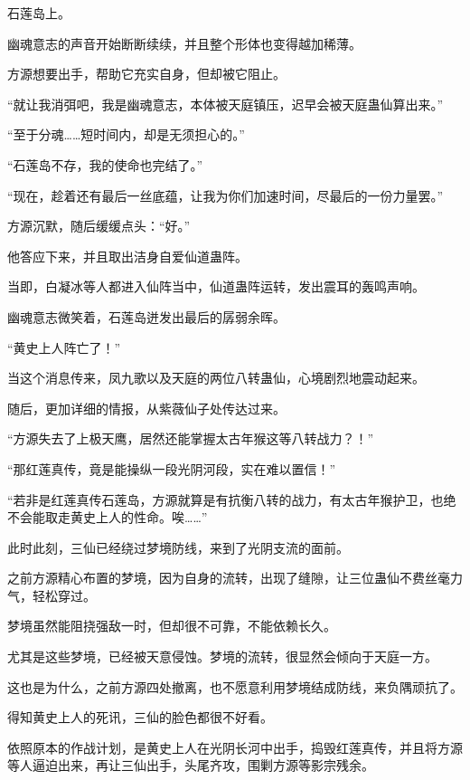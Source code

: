 
\begin{this_body}

石莲岛上。

幽魂意志的声音开始断断续续，并且整个形体也变得越加稀薄。

方源想要出手，帮助它充实自身，但却被它阻止。

“就让我消弭吧，我是幽魂意志，本体被天庭镇压，迟早会被天庭蛊仙算出来。”

“至于分魂……短时间内，却是无须担心的。”

“石莲岛不存，我的使命也完结了。”

“现在，趁着还有最后一丝底蕴，让我为你们加速时间，尽最后的一份力量罢。”

方源沉默，随后缓缓点头：“好。”

他答应下来，并且取出洁身自爱仙道蛊阵。

当即，白凝冰等人都进入仙阵当中，仙道蛊阵运转，发出震耳的轰鸣声响。

幽魂意志微笑着，石莲岛迸发出最后的孱弱余晖。

“黄史上人阵亡了！”

当这个消息传来，凤九歌以及天庭的两位八转蛊仙，心境剧烈地震动起来。

随后，更加详细的情报，从紫薇仙子处传达过来。

“方源失去了上极天鹰，居然还能掌握太古年猴这等八转战力？！”

“那红莲真传，竟是能操纵一段光阴河段，实在难以置信！”

“若非是红莲真传石莲岛，方源就算是有抗衡八转的战力，有太古年猴护卫，也绝不会能取走黄史上人的性命。唉……”

此时此刻，三仙已经绕过梦境防线，来到了光阴支流的面前。

之前方源精心布置的梦境，因为自身的流转，出现了缝隙，让三位蛊仙不费丝毫力气，轻松穿过。

梦境虽然能阻挠强敌一时，但却很不可靠，不能依赖长久。

尤其是这些梦境，已经被天意侵蚀。梦境的流转，很显然会倾向于天庭一方。

这也是为什么，之前方源四处撤离，也不愿意利用梦境结成防线，来负隅顽抗了。

得知黄史上人的死讯，三仙的脸色都很不好看。

依照原本的作战计划，是黄史上人在光阴长河中出手，捣毁红莲真传，并且将方源等人逼迫出来，再让三仙出手，头尾齐攻，围剿方源等影宗残余。


\end{this_body}
